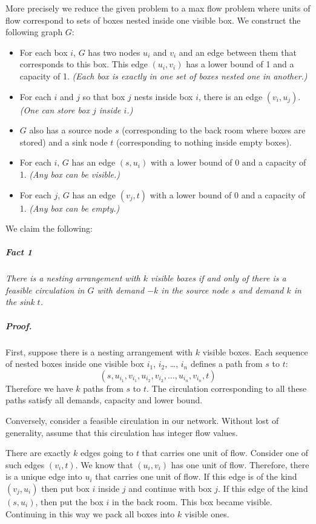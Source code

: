 \documentclass[12pt]{article}
\begin{document}
\begin{enumerate}
{More precisely we reduce the given problem to a max flow problem
where units of flow correspond to sets of boxes nested
inside one visible box.
We construct the following graph $G$:
\begin{itemize}
\item For each box $i$, $G$ has two nodes $u_i$ and $v_i$
  and an edge between them that corresponds to this box.
  This edge $(u_i,v_i)$ has a lower bound of 1 and a capacity of 1.
  {\em (Each box is exactly in one set of boxes nested one
  in another.)}
\item For each $i$ and $j$ so that box $j$ nests inside box $i$,
  there is an edge $(v_i,u_j)$.
  {\em (One can store box $j$ inside $i$.)}
\item $G$ also has a source node $s$ (corresponding to the back room where
  boxes are stored) and a sink node $t$ (corresponding to nothing inside
  empty boxes).
\item For each $i$, $G$ has an edge $(s,u_i)$ with a lower bound of 0 and a
  capacity of 1.
  {\em (Any box can be visible.)}
\item For each $j$, $G$ has an edge $(v_j,t)$ with a lower bound of 0 and a
  capacity of 1.
  {\em (Any box can be empty.)}
\end{itemize}


We claim the following:
\subparagraph {Fact 1}
{\em There is a nesting arrangement with $k$ visible boxes if and only of
  there is a feasible circulation in $G$ with demand $-k$ in the source node
  $s$ and demand $k$ in the sink $t$.
}


\subparagraph{Proof.}
First, suppose there is a nesting arrangement with $k$ visible boxes.
Each sequence of nested boxes inside one visible box $i_1$, $i_2$, \dots, $i_n$
defines a path from $s$ to $t$:
$$(s,u_{i_1},v_{i_1},u_{i_2},v_{i_2},\dots,u_{i_n},v_{i_n},t)$$
Therefore we have $k$ paths from $s$ to $t$.
The circulation corresponding to all these paths satisfy all demands,
capacity and lower bound.

Conversely, consider a feasible circulation in our network.
Without lost of generality, assume that this circulation has
integer flow values.

There are exactly $k$ edges going to $t$ that carries one unit of flow.
Consider one of such edges $(v_i,t)$.
We know that $(u_i,v_i)$ has one unit of flow.
Therefore, there is a unique edge into $u_i$ that carries one unit of flow.
If this edge is of the kind $(v_j,u_i)$ then put box $i$ inside $j$ and
continue with box $j$.
If this edge of the kind $(s,u_i)$, then put the box $i$ in the back room.
This box became visible.
Continuing in this way we pack all boxes into $k$ visible ones.

}
\end{enumerate}
\end{document}
